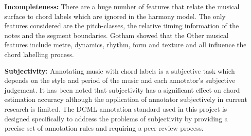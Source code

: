 \documentclass[12pt,a4paper,twoside,openany]{report} \usepackage[pdfborder={0 0 0}]{hyperref}    %
\theoremstyle{definition} \newtheorem{definition}{Definition}[section]
\begin{document}
  \textbf{Incompleteness: } There are a huge number of features that relate the musical surface to chord labels which are
  ignored in the harmony model. The only features considered are the pitch-classes, the relative timing information of the
  notes and the segment boundaries. Gotham showed that the  Other musical features include metre, dynamics, rhythm, form
  and texture and all influence the chord labelling process. 

  \textbf{Subjectivity: } Annotating music with chord labels is a subjective task which depends on the style
  and period of the music and each annotator's subjective judgement. It has been noted that subjectivity has a significant
  effect on chord estimation accuracy\cite{niUnderstandingEffectsSubjectivity2013} although the application of annotator
  subjectively in current research is limited. The DCML annotation standard used in this project is
  designed specifically to address the problems of subjectivity by providing a precise set of annotation rules and
  requiring a peer review process. 



\end{document}
